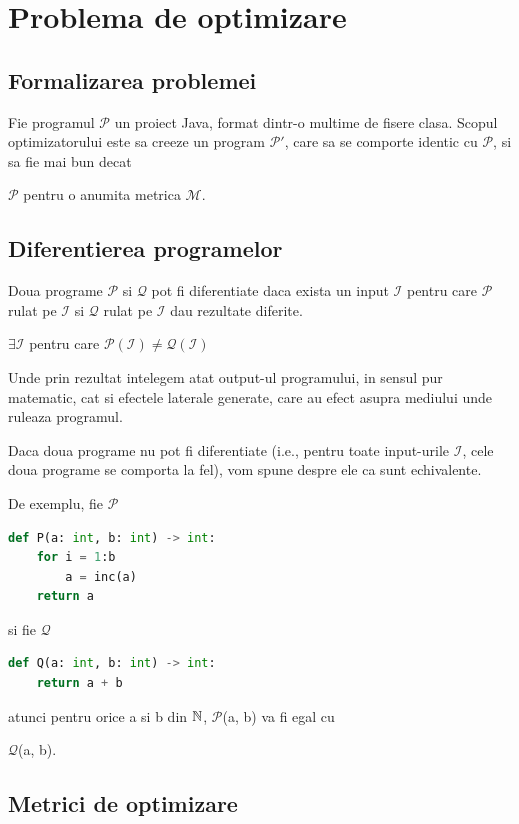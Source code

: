 \newcommand{\s}[1]{
    \(\mathcal{#1}\)}

\chapter{Problema de optimizare}

\section{Formalizarea problemei}

Fie programul \s{P} un proiect Java, format dintr-o multime de fisere
clasa.  Scopul optimizatorului este sa creeze un program \s{P'}, care
sa se comporte identic cu \s{P}, si sa fie mai bun decat
\s{P} pentru o anumita metrica \s{M}.

\section{Diferentierea programelor}

Doua programe \s{P} si \s{Q} pot fi diferentiate daca
exista un input \s{I} pentru care \s{P} rulat pe \s{I}
si \s{Q} rulat pe \s{I} dau rezultate diferite.

\(\exists \mathcal{I}\) pentru care \(\mathcal{P}(\mathcal{I}) \ne
\mathcal{Q}(\mathcal{I}) \)

Unde prin rezultat intelegem atat output-ul programului, in
sensul pur matematic, cat si efectele laterale generate, care au
efect asupra mediului unde ruleaza programul.

Daca doua programe nu pot fi diferentiate (i.e., pentru toate
input-urile \s{I}, cele doua programe se comporta la fel), vom
spune despre ele ca sunt echivalente.

De exemplu, fie \s{P}

\begin{lstlisting}[language=Python,label={programul_p}]
def P(a: int, b: int) -> int:
    for i = 1:b
        a = inc(a)
    return a
\end{lstlisting}

si fie \s{Q}

\begin{lstlisting}[language=Python,label={programul_q}]
def Q(a: int, b: int) -> int:
    return a + b
\end{lstlisting}

atunci pentru orice a si b din $\mathbb{N}$, \s{P}(a, b) va fi egal cu
\s{Q}(a, b).

\section{Metrici de optimizare}

